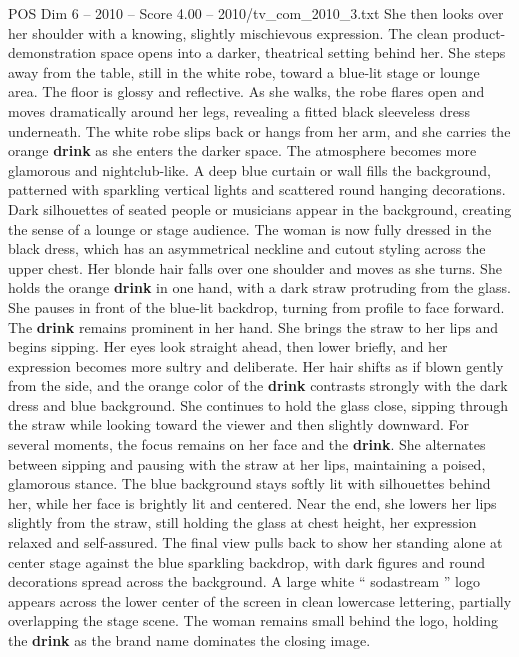 \begin{textsample}{POS Dim 6 – 2010 – Score 4.00 – 2010/tv\_com\_2010\_3.txt}
She then looks over her shoulder with a knowing, slightly mischievous expression.
The clean product-demonstration space opens into a darker, theatrical setting behind her.
She steps away from the table, still in the white robe, toward a blue-lit stage or lounge area.
The floor is glossy and reflective.
As she walks, the robe flares open and moves dramatically around her legs, revealing a fitted black sleeveless dress underneath.
The white robe slips back or hangs from her arm, and she carries the orange \textbf{drink} as she enters the darker space.
The atmosphere becomes more glamorous and nightclub-like.
A deep blue curtain or wall fills the background, patterned with sparkling vertical lights and scattered round hanging decorations.
Dark silhouettes of seated people or musicians appear in the background, creating the sense of a lounge or stage audience.
The woman is now fully dressed in the black dress, which has an asymmetrical neckline and cutout styling across the upper chest.
Her blonde hair falls over one shoulder and moves as she turns.
She holds the orange \textbf{drink} in one hand, with a dark straw protruding from the glass.
She pauses in front of the blue-lit backdrop, turning from profile to face forward.
The \textbf{drink} remains prominent in her hand.
She brings the straw to her lips and begins sipping.
Her eyes look straight ahead, then lower briefly, and her expression becomes more sultry and deliberate.
Her hair shifts as if blown gently from the side, and the orange color of the \textbf{drink} contrasts strongly with the dark dress and blue background.
She continues to hold the glass close, sipping through the straw while looking toward the viewer and then slightly downward.
For several moments, the focus remains on her face and the \textbf{drink}.
She alternates between sipping and pausing with the straw at her lips, maintaining a poised, glamorous stance.
The blue background stays softly lit with silhouettes behind her, while her face is brightly lit and centered.
Near the end, she lowers her lips slightly from the straw, still holding the glass at chest height, her expression relaxed and self-assured.
The final view pulls back to show her standing alone at center stage against the blue sparkling backdrop, with dark figures and round decorations spread across the background.
A large white “ sodastream ” logo appears across the lower center of the screen in clean lowercase lettering, partially overlapping the stage scene.
The woman remains small behind the logo, holding the \textbf{drink} as the brand name dominates the closing image.

\end{textsample}
